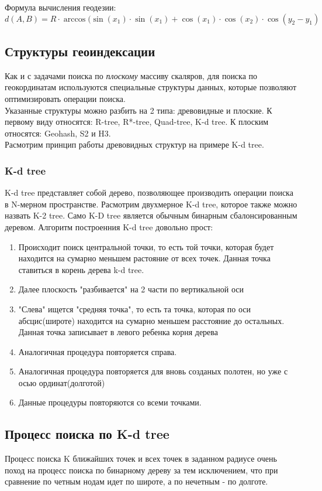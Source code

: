 Формула вычисления геодезии:
$$
d(A, B) = R \cdot \arccos(\sin(x_1) \cdot \sin(x_1) + \cos(x_1) \cdot \cos(x_2) \cdot \cos(y_2 - y_1)
$$


\subsection{Структуры геоиндексации}
Как и с задачами поиска по \textit{плоскому} массиву скаляров, для поиска по геокординатам используются специальные структуры данных, которые позволяют оптимизировать операции поиска. \\
Указанные структуры можно разбить на 2 типа: древовидные и плоские. К первому виду относятся: R-tree, R*-tree, Quad-tree, K-d tree. К плоским относятся: Geohash, S2 и H3. \\
Расмотрим принцип работы древовидных структур на примере K-d tree.\\
\subsubsection{K-d tree}
K-d tree представляет собой дерево, позволяющее производить операции поиска в N-мерном пространстве. Расмотрим двухмерное K-d tree, которое также можно назвать K-2 tree.
Само K-D tree является обычным бинарным сбалонсированным деревом.
Алгоритм построенния K-d tree довольно прост:
\begin{enumerate}
    \item Происходит поиск центральной точки, то есть той точки, которая будет находится на сумарно меньшем растояние от всех точек. Данная точка ставиться в корень дерева k-d tree.
    \item Далее плоскость "разбивается" на 2 части по вертикальной оси
    \item "Слева" ищется "средняя точка", то есть та точка, которая по оси абсцис(широте) находится на сумарно меньшем расстояние до остальных. Данная точка записывает в левого ребенка корня дерева
    \item Аналогичная процедура повторяется справа.
    \item Аналогичная процедура повторяется для вновь созданых полотен, но уже с осью ординат(долготой)
    \item Данные процедуры повторяются со всеми точками.
\end{enumerate}
\subsection{Процесс поиска по K-d tree}
Процесс поиска K ближайших точек и всех точек в заданном радиусе очень поход на процесс поиска по бинарному дереву за тем исключением, что при сравнение по четным нодам идет по широте, а по нечетным - по долготе.


